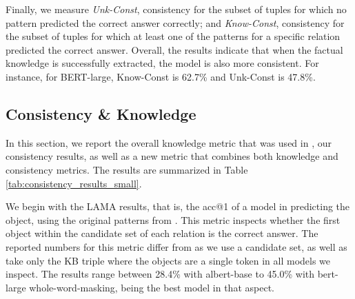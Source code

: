 Finally, we measure \emph{Unk-Const}, consistency  for the subset of tuples
for which no pattern predicted the correct answer correctly;
and \emph{Know-Const},
consistency for the subset of tuples for which
at least one of the patterns for a specific
relation predicted the correct answer.
Overall, the results indicate that when the factual knowledge is successfully extracted, the model is also more consistent.
For instance, for BERT-large, Know-Const  is 62.7\% and Unk-Const is 47.8\%. 


\subsection{Consistency \& Knowledge}

In this section, we report the overall knowledge metric that was used in \citet{lama}, our consistency results, as well as a new metric that combines both knowledge and consistency metrics.
The results are summarized in Table \ref{tab:consistency_results_small}.

We begin with the LAMA results, that is, the acc@1 of a model in predicting the object, using the original patterns from \citet{lama}. This metric inspects whether the first object within the candidate set of each relation is the correct answer. The reported numbers for this metric differ from \citet{lama} as we use a candidate set, as well as take only the KB triple where the objects are a single token in all models we inspect. The results range between 28.4\% with albert-base to 45.0\% with bert-large whole-word-masking, being the best model in that aspect.

